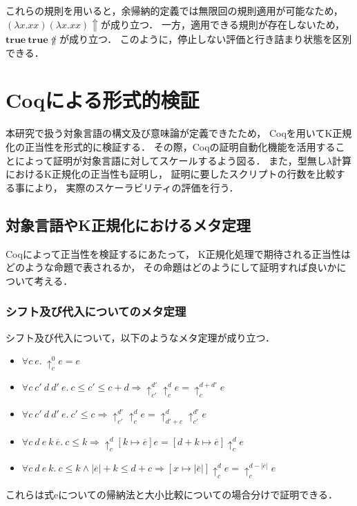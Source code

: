 \documentclass{sumiilab-paper}
\newcommand{\keyword}[1]{\mathbf{#1}}
\newcommand{\TRUE}{\keyword{true}}
\begin{document}
これらの規則を用いると，余帰納的定義では無限回の規則適用が可能なため，
$(\lambda x.x x)(\lambda x.x x) \Uparrow$が成り立つ．
一方，適用できる規則が存在しないため，$\TRUE~\TRUE \not \Uparrow$が成り立つ．
このように，停止しない評価と行き詰まり状態を区別できる．

\chapter{Coqによる形式的検証}
本研究で扱う対象言語の構文及び意味論が定義できたため，
Coqを用いてK正規化の正当性を形式的に検証する．
その際，Coqの証明自動化機能を活用することによって証明が対象言語に対してスケールするよう図る．
また，型無し$\lambda$計算におけるK正規化の正当性も証明し，
証明に要したスクリプトの行数を比較する事により，
実際のスケーラビリティの評価を行う．

\section{対象言語やK正規化におけるメタ定理}
Coqによって正当性を検証するにあたって，
K正規化処理で期待される正当性はどのような命題で表されるか，
その命題はどのようにして証明すれば良いかについて考える．

\subsection{シフト及び代入についてのメタ定理}
シフト及び代入について，以下のようなメタ定理が成り立つ．
\begin{itemize}
	\item $\forall c~e.~\uparrow^0_c e = e$
	\item $\forall c~c'~d~d'~e.~c \leq c' \leq c + d \Longrightarrow \uparrow^{d'}_{c'} \uparrow^d_c e = \uparrow^{d+d'}_c e$
	\item $\forall c~c'~d~d'~e.~c' \leq c \Longrightarrow \uparrow^{d'}_{c'} \uparrow^d_c e = \uparrow^{d}_{d'+ c} \uparrow^{d'}_{c'} e$
	\item $\forall c~d~e~k~\overline{e}.~c \leq k \Longrightarrow \uparrow^d_c [k \mapsto \overline{e}] e = [d + k \mapsto \overline{e}] \uparrow^d_c e$
	\item $\forall c~d~e~k.~c \leq k \land |\overline{e}| + k \leq d + c \Longrightarrow [x \mapsto |\overline{e}| ] \uparrow^d_c e = \uparrow^{d-|\overline{e}|}_c e$
\end{itemize}

これらは式eについての帰納法と大小比較についての場合分けで証明できる．
\end{document}
